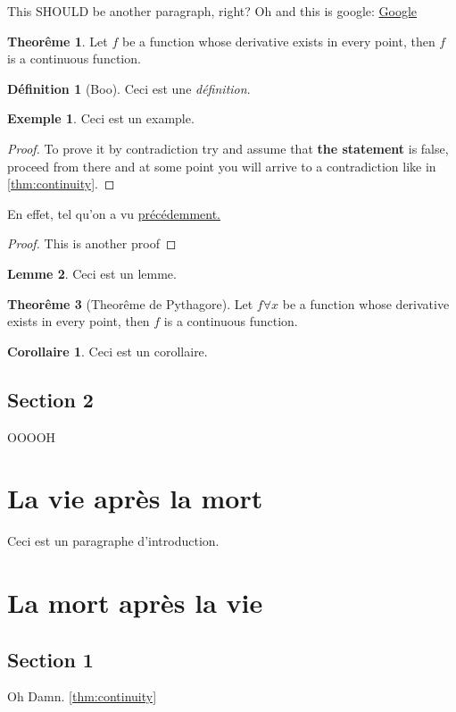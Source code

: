 \documentclass[10pt]{book}
\def\sep{\phantom{}}
\theoremstyle{definition}
\newtheorem{definition}{Définition}[section]
\newtheorem*{example}{Exemple}
\newtheorem{theorem}{Theorême}[section]
\newtheorem{corollary}{Corollaire}[theorem]
\newtheorem{lemma}[theorem]{Lemme}
\begin{document}
This SHOULD be another paragraph, right? Oh and this is google: \href{http://google.com}{Google}
\begin{theorem}
    \label{thm:continuity}
    Let $f$ be a function whose derivative exists    in every point,
    then $f$ is a continuous function.
\end{theorem}
\begin{definition}[Boo]
    Ceci est une \textit{définition}.
\end{definition}
\begin{example}
    Ceci est un example.
\end{example}
\begin{proof}
    To prove it by contradiction try and assume that \textbf{the statement} is false, \sep
    proceed from there and at some point you will arrive to a contradiction like in \autoref{thm:continuity}.
\end{proof}
\begin{comment}
    This is a comment, \sep
    a multi-line comment,
\end{comment}
En effet, tel qu'on a vu \hyperref[thm:continuity]{précédemment.}
\begin{proof}
    This is another proof
\end{proof}
\begin{comment}
    This is a comment.
\end{comment}
\begin{lemma}
    Ceci est un lemme.
\end{lemma}
\begin{theorem}[Theorême de Pythagore]
    Let $f \forall x$ be a function whose derivative exists in every point,
    then $f$ is a continuous function. 
\end{theorem}
\begin{corollary}
    Ceci est un corollaire.
\end{corollary}
\section{Section 2}
OOOOH

\chapter{La vie après la mort}
Ceci est un paragraphe d'introduction.
\chapter{La mort après la vie}
\section{Section 1}
Oh Damn. \autoref{thm:continuity}
\end{document}
